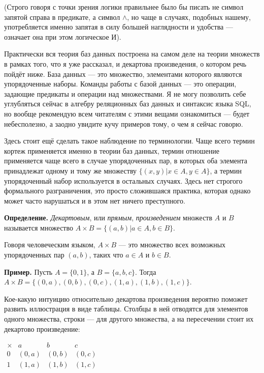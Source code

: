 (Строго говоря с точки зрения логики правильнее было бы писать не символ запятой справа в предикате, а символ $\wedge$, но чаще в случаях, подобных нашему, употребляется именно запятая в силу большей наглядности и удобства — означает она при этом логическое И).

Практически вся теория баз данных построена на самом деле на теории множеств в рамках того, что я уже рассказал, и декартова произведения, о котором речь пойдёт ниже. База данных — это множество, элементами которого являются упорядоченные наборы. Команды работы с базой данных — это операции, задающие предикаты и операции над множествами. Я не могу позволить себе углубляться сейчас в алгебру реляционных баз данных и синтаксис языка SQL, но вообще рекомендую всем читателям с этими вещами ознакомиться — будет небесполезно, а заодно увидите кучу примеров тому, о чем я сейчас говорю.

Здесь стоит ещё сделать такое наблюдение по терминологии. Чаще всего термин кортеж применяется именно в теории баз данных, термин отношение применяется чаще всего в случае упорядоченных пар, в которых оба элемента принадлежат одному и тому же множеству $\{(x, y)|x\in A, y\in A\}$, а термин упорядоченный набор используется в остальных случаях. Здесь нет строгого формального разграничения, это просто сложившаяся практика, которая однако может часто нарушаться и в этом нет ничего преступного.

{\bfseries Определение.} {\slshape Декартовым}, или {\slshape прямым}, {\slshape произведением} множеств $A$ и $B$ называется множество $A\times B = \{(a, b)|a\in A, b\in B\}$.

Говоря человеческим языком, $A\times B$ — это множество всех возможных упорядоченных пар $(a, b)$, таких что $a\in A$ и $b \in B$.

{\bfseries Пример.} Пусть $A = \{0, 1\}$, а $B = \{a, b, c\}$. Тогда $A\times B = \{(0, a), (0, b), (0, c), (1, a), (1, b), (1, c)\}$.

Кое-какую интуицию относительно декартова произведения вероятно поможет развить иллюстрация в виде таблицы. Столбцы в ней отводятся для элементов одного множества, строки — для другого множества, а на пересечении стоит их декартово произведение:

$\begin{array}{c|ccc}\times & a&b&c\\ \hline 0 & (0,a) & (0, b) & (0, c) \\ 1 & (1, a)& (1, b) &(1, c)\end{array}$


